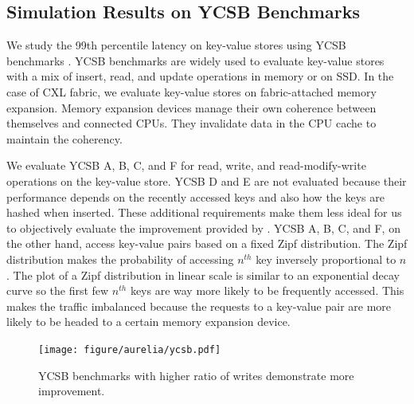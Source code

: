 \subsection{Simulation Results on YCSB Benchmarks}
\label{aurelia:sec:eval:kv-store}
%
We study the 99th percentile latency on key-value stores using YCSB benchmarks \cite{ycsb:socc:2010}.
%
YCSB benchmarks are widely used to evaluate key-value stores with a mix of insert, read, and update operations in memory or on SSD.
%
%
In the case of CXL fabric, we evaluate key-value stores on fabric-attached memory expansion.
%
Memory expansion devices manage their own coherence between themselves and connected CPUs.
%
They invalidate data in the CPU cache to maintain the coherency.

We evaluate YCSB A, B, C, and F for read, write, and read-modify-write operations on the key-value store.
%
YCSB D and E are not evaluated because their performance depends on the recently accessed keys and also how the keys are hashed when inserted. 
%
These additional requirements make them less ideal for us to objectively evaluate the improvement provided by \aurelia.
%
YCSB A, B, C, and F, on the other hand, access key-value pairs based on a fixed Zipf distribution.
%
The Zipf distribution makes the probability of accessing $n^{th}$ key inversely proportional to $n$.
%
The plot of a Zipf distribution in linear scale is similar to an exponential decay curve so the first few $n^{th}$ keys are way more likely to be frequently accessed.
%
This makes the traffic imbalanced because the requests to a key-value pair are more likely to be headed to a certain memory expansion device. 


\begin{figure}[ht!]    
    \centering
    \texttt{[image: figure/aurelia/ycsb.pdf]}
    \caption{YCSB benchmarks with higher ratio of writes demonstrate more improvement.} 
    \label{fig:cxl-ycsb-results}
\end{figure}

